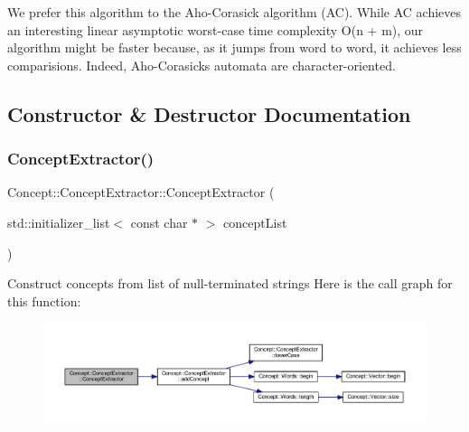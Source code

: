 We prefer this algorithm to the Aho-\/\+Corasick algorithm (AC). While AC achieves an interesting linear asymptotic worst-\/case time complexity O(n + m), our algorithm might be faster because, as it jumps from word to word, it achieves less comparisions. Indeed, Aho-\/\+Corasick\textquotesingle{}s automata are character-\/oriented. 

\subsection{Constructor \& Destructor Documentation}
\mbox{\label{class_concept_1_1_concept_extractor_a3368cfbb0efde84ec506ffa6dfa260b3}} 
\subsubsection{\texorpdfstring{ConceptExtractor()}{ConceptExtractor()}\hspace{0.1cm}{\footnotesize\ttfamily [1/2]}}
{\footnotesize\ttfamily Concept\+::\+Concept\+Extractor\+::\+Concept\+Extractor (\begin{DoxyParamCaption}\item[{std\+::initializer\+\_\+list$<$ const char $\ast$ $>$}]{concept\+List }\end{DoxyParamCaption})\hspace{0.3cm}{\ttfamily [inline]}}

Construct concepts from list of null-\/terminated strings Here is the call graph for this function\+:\nopagebreak
\begin{figure}[H]
\begin{center}
\leavevmode
\includegraphics[width=350pt]{class_concept_1_1_concept_extractor_a3368cfbb0efde84ec506ffa6dfa260b3_cgraph}
\end{center}
\end{figure}
\mbox{\label{class_concept_1_1_concept_extractor_ad4f2e846cdbeed815dc018bc5235716c}} 
